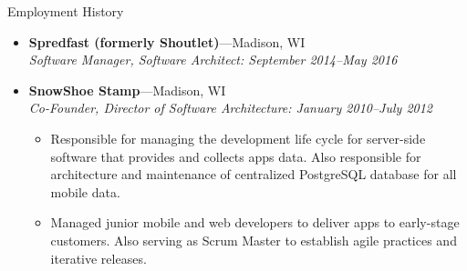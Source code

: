 \documentclass[11pt,oneside]{article}
\newenvironment{ressectionx}[1]{
	\vspace{4pt}
	{\fontfamily{phv}\selectfont\Large#1}
	\begin{itemize}[label={}]
	\vspace{3pt}
}{
	\end{itemize}
}
\newcommand{\ressubitem}[1]{
	\vspace{-1pt}
	\item \begin{flushleft} #1 \end{flushleft}
}
\newcommand{\resbigitem}[3]{
	\vspace{-5pt}
	\item
	\textbf{#1}---#2 \\
	\textit{#3}
}
\newenvironment{ressubsec}[3]{
	\resbigitem{#1}{#2}{#3}
	\vspace{-2pt}
	\begin{itemize}
}{
	\end{itemize}
}
\begin{document}
\begin{ressectionx}{Employment History}
\begin{ressubsec}{Spredfast (formerly Shoutlet)}{Madison, WI}{Software Manager, Software Architect: September 2014--May 2016}
	\end{ressubsec}


	\begin{ressubsec}{SnowShoe Stamp}{Madison, WI}{Co-Founder, Director of Software Architecture: January 2010--July 2012}
		\ressubitem{Responsible for managing the development life cycle for server-side software that provides and collects apps data. Also responsible for architecture and maintenance of centralized PostgreSQL database for all mobile data.  }
				\ressubitem{Managed junior mobile and web developers to deliver apps to early-stage customers. Also serving as Scrum Master to establish agile practices and iterative releases. }

	\end{ressubsec}



\end{ressectionx}
\end{document}
